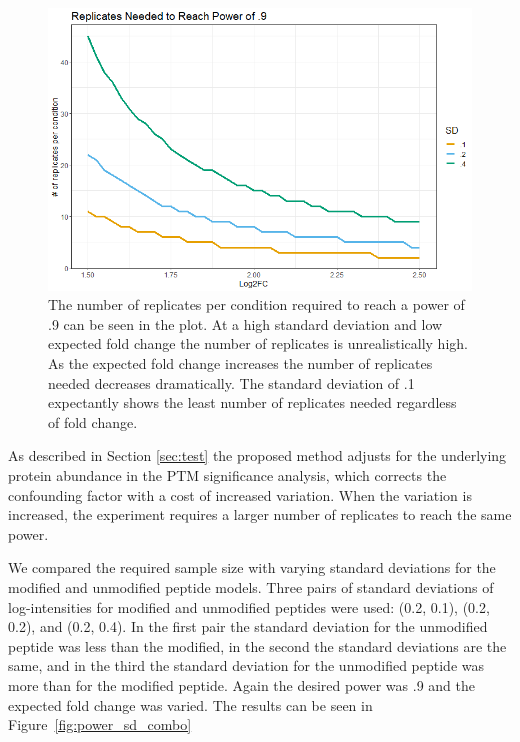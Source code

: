 \documentclass{mcp}
\def\sfigref#1{{Figure~\ref{#1}}}
\begin{document}
\begin{figure}[h!]
\centering
\includegraphics[width=\textwidth]{sim_new/simple_power_analysis}
\caption{The number of replicates per condition required to reach a power of .9 can be seen in the plot. At a high standard deviation and low expected fold change the number of replicates is unrealistically high. As the expected fold change increases the number of replicates needed decreases dramatically. The standard deviation of .1 expectantly shows the least number of replicates needed regardless of fold change.}
\label{fig:sample_size}
\end{figure}


As described in Section \ref{sec:test} the proposed method adjusts for the underlying protein abundance in the PTM significance analysis, which corrects the confounding factor with a cost of increased variation. When the variation is increased, the experiment requires a larger number of replicates to reach the same power. 

We compared the required sample size with varying standard deviations for the modified and unmodified peptide models. Three pairs of standard deviations of log-intensities for modified and unmodified peptides were used: (0.2, 0.1), (0.2, 0.2), and (0.2, 0.4). In the first pair the standard deviation for the unmodified peptide was less than the modified, in the second the standard deviations are the same, and in the third the standard deviation for the unmodified peptide was more than for the modified peptide. Again the desired power was .9 and the expected fold change was varied. The results can be seen in \sfigref{fig:power_sd_combo}
\end{document}
